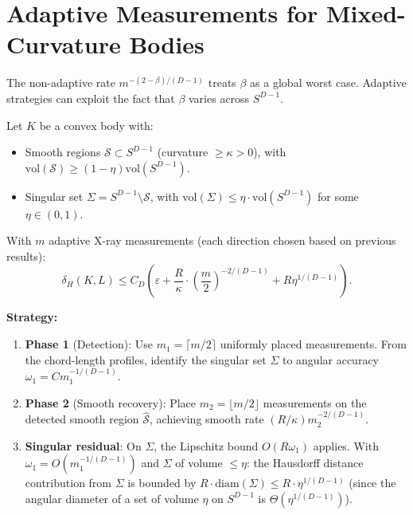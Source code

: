 \section{Adaptive Measurements for Mixed-Curvature Bodies}

The non-adaptive rate $m^{-(2-\beta)/(D-1)}$ treats $\beta$ as a global worst case. Adaptive strategies can exploit the fact that $\beta$ varies across $S^{D-1}$.

\begin{theorem}
\label{thm:adaptive}
Let $K$ be a convex body with:
\begin{itemize}
  \item Smooth regions $\mathcal{S} \subset S^{D-1}$ (curvature $\geq \kappa > 0$), with $\mathrm{vol}(\mathcal{S}) \geq (1 - \eta) \mathrm{vol}(S^{D-1})$.
  \item Singular set $\Sigma = S^{D-1} \setminus \mathcal{S}$, with $\mathrm{vol}(\Sigma) \leq \eta \cdot \mathrm{vol}(S^{D-1})$ for some $\eta \in (0, 1)$.
\end{itemize}
With $m$ adaptive X-ray measurements (each direction chosen based on previous results):
\[
  \delta_H(K, L) \leq C_D\!\left(\varepsilon + \frac{R}{\kappa} \cdot \left(\frac{m}{2}\right)^{-2/(D-1)} + R\eta^{1/(D-1)}\right).
\]

\textbf{Strategy:}
\begin{enumerate}
  \item \textbf{Phase 1} (Detection): Use $m_1 = \lceil m/2 \rceil$ uniformly placed measurements. From the chord-length profiles, identify the singular set $\Sigma$ to angular accuracy $\omega_1 = C m_1^{-1/(D-1)}$.
  
  \item \textbf{Phase 2} (Smooth recovery): Place $m_2 = \lfloor m/2 \rfloor$ measurements on the detected smooth region $\hat{\mathcal{S}}$, achieving smooth rate $(R/\kappa) m_2^{-2/(D-1)}$.
  
  \item \textbf{Singular residual}: On $\Sigma$, the Lipschitz bound $O(R \omega_1)$ applies. With $\omega_1 = O(m_1^{-1/(D-1)})$ and $\Sigma$ of volume $\leq \eta$: the Hausdorff distance contribution from $\Sigma$ is bounded by $R \cdot \mathrm{diam}(\Sigma) \leq R \cdot \eta^{1/(D-1)}$ (since the angular diameter of a set of volume $\eta$ on $S^{D-1}$ is $\Theta(\eta^{1/(D-1)})$).
\end{enumerate}
\end{theorem}

